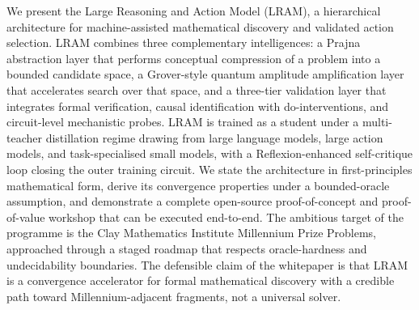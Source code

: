 We present the Large Reasoning and Action Model (LRAM), a hierarchical architecture for machine-assisted mathematical discovery and validated action selection. LRAM combines three complementary intelligences: a Prajna abstraction layer that performs conceptual compression of a problem into a bounded candidate space, a Grover-style quantum amplitude amplification layer that accelerates search over that space, and a three-tier validation layer that integrates formal verification, causal identification with do-interventions, and circuit-level mechanistic probes. LRAM is trained as a student under a multi-teacher distillation regime drawing from large language models, large action models, and task-specialised small models, with a Reflexion-enhanced self-critique loop closing the outer training circuit. We state the architecture in first-principles mathematical form, derive its convergence properties under a bounded-oracle assumption, and demonstrate a complete open-source proof-of-concept and proof-of-value workshop that can be executed end-to-end. The ambitious target of the programme is the Clay Mathematics Institute Millennium Prize Problems, approached through a staged roadmap that respects oracle-hardness and undecidability boundaries. The defensible claim of the whitepaper is that LRAM is a convergence accelerator for formal mathematical discovery with a credible path toward Millennium-adjacent fragments, not a universal solver.
